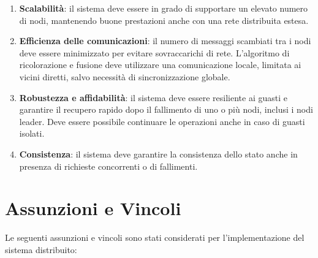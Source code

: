 \documentclass[12pt, a4paper]{report}
\begin{document}
\begin{enumerate}
    \item \textbf{Scalabilit\`a}: il sistema deve essere in grado di supportare un elevato numero di nodi, mantenendo buone prestazioni anche con una rete distribuita estesa.

    \item \textbf{Efficienza delle comunicazioni}: il numero di messaggi scambiati tra i nodi deve essere minimizzato per evitare sovraccarichi di rete. L'algoritmo di ricolorazione e fusione deve utilizzare una comunicazione locale, limitata ai vicini diretti, salvo necessit\`a di sincronizzazione globale.

    \item \textbf{Robustezza e affidabilit\`a}: il sistema deve essere resiliente ai guasti e garantire il recupero rapido dopo il fallimento di uno o pi\`u nodi, inclusi i nodi leader. Deve essere possibile continuare le operazioni anche in caso di guasti isolati.

    \item \textbf{Consistenza}: il sistema deve garantire la consistenza dello stato anche in presenza di richieste concorrenti o di fallimenti.

\end{enumerate}

\section{Assunzioni e Vincoli}

Le seguenti assunzioni e vincoli sono stati considerati per l'implementazione del sistema distribuito:
\end{document}
